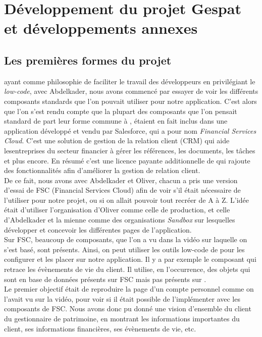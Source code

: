 \documentclass[12pt,oneside,noprintercorrection]{iut}
\begin{document}
\clearpage

\chapter{Développement du projet Gespat et développements annexes}

\section{Les premières formes du projet}
\slf{} ayant comme philosophie de faciliter le travail des développeurs en privilégiant le \textit{low-code}, avec Abdelkader, nous avons commencé par essayer de voir les différents composants standards que l'on pouvait utiliser pour notre application. C'est alors que l'on s'est rendu compte que la plupart des composants que l'on pensait standard de part leur forme commune à \slf{}, étaient en fait inclus dans une application développé et vendu par Salesforce, qui a pour nom \textit{Financial Services Cloud}. C'est une solution de gestion de la relation client (CRM) qui aide lesentreprises du secteur financier à gérer les références, les documents, les tâches et plus encore. En résumé c'est une licence payante additionnelle de \slf{} qui rajoute des
fonctionnalités afin d'améliorer la gestion de relation client.
~\\\indent De ce fait, nous avons avec Abdelkader et Oliver, chacun a pris une version d'essai de FSC (Financial Services  Cloud) afin de voir s'il était nécessaire de l'utiliser pour notre projet, ou si on allait pouvoir tout recréer de A à Z. L'idée était d'utiliser l'organisation d'Oliver comme celle de production, et celle d'Abdelkader et la mienne comme des organisations \textit{Sandbox} sur lesquelles développer et concevoir les différentes pages de l'application. 
~\\\indent Sur FSC, beaucoup de composants, que l'on a vu dans la vidéo sur laquelle on s'est basé, sont présents. Ainsi, on peut utiliser les outils low-code de \slf{} pour les configurer et les placer sur notre application. Il y a par exemple le composant qui retrace les évènements de vie du client. Il utilise, en l'occurrence, des objets qui sont en base de données présents sur FSC mais pas présents sur \slf{}.
~\\\indent Le premier objectif était de reproduire la page d'un compte personnel comme on l'avait vu sur la vidéo, pour voir si il était possible de l'implémenter avec les composants de FSC. Nous avons donc pu donné une vision d'ensemble du client du gestionnaire de patrimoine, en montrant les informations importantes du client, ses informations financières, ses évènements de vie, etc.
\end{document}
